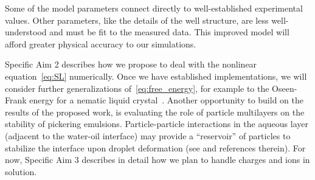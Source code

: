 Some of the model parameters connect directly
to well-established experimental values. Other
parameters, like the details of the well structure,
are less well-understood and must be fit to the measured data.
This improved model will afford greater physical accuracy to
our simulations.


Specific Aim 2 describes how we propose to deal with the nonlinear
equation~\eqref{eq:SL} numerically. Once we have established
implementations, we will consider further generalizations
of~\eqref{eq:free_energy}, for example to the Oseen-Frank energy for a
nematic liquid crystal~\cite{doi:10.1137/15M103844X,
  Bartels,AIHPA_1997__66_4_411_0, deGennesProst,HaKiLi86,Virga}.
Another opportunity to build on the results of the proposed work,
is evaluating the role of particle multilayers on the stability of
pickering emulsions. Particle-particle interactions in the aqueous
layer (adjacent to the water-oil interface) may provide a
``reservoir'' of particles to stabilize the interface upon droplet deformation (see \cite{Bradley2016} and references therein).
For now,
Specific Aim 3 describes in detail how we plan to handle charges and
ions in solution.



